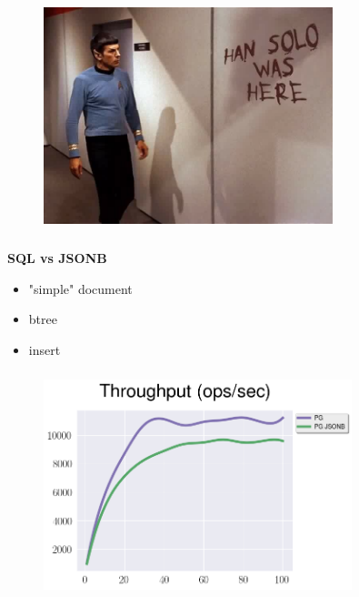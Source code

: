 \documentclass[usenames,dvipsnames, 18pt, compress, aspectratio=169]{beamer}
\begin{document}
\begin{frame}
    \frametitle{}
    \begin{center}
    \vspace{10pt}
    \begin{figure}
        \includegraphics[width=0.75\textwidth,center]{geek-meme-star-trek-han-solo.jpg}
    \end{figure}
    \end{center}
\end{frame}

\begin{frame}
    \frametitle{}
    \begin{center}
        \textbf{SQL vs JSONB}
        \begin{itemize}[label={}]
            \item "simple" document
            \item btree
            \item insert
        \end{itemize}
    \end{center}
\end{frame}

\begin{frame}
    \frametitle{}
    \begin{center}
    \vspace{10pt}
    \begin{figure}
        \includegraphics[width=0.8\textwidth,center]{benchmarks/postgresql_load_jsonb_jdbc.png}
    \end{figure}
    \end{center}
\end{frame}
\end{document}
